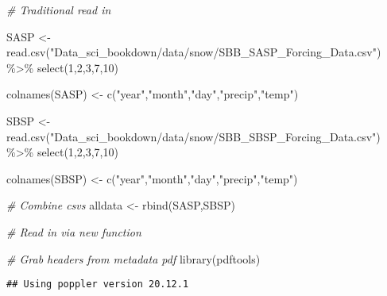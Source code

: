 \documentclass[
]{book}
\newenvironment{Shaded}{\begin{snugshade}}{\end{snugshade}}
\newcommand{\CommentTok}[1]{\textcolor[rgb]{0.56,0.35,0.01}{\textit{#1}}}
\newcommand{\DecValTok}[1]{\textcolor[rgb]{0.00,0.00,0.81}{#1}}
\newcommand{\FunctionTok}[1]{\textcolor[rgb]{0.00,0.00,0.00}{#1}}
\newcommand{\NormalTok}[1]{#1}
\newcommand{\OtherTok}[1]{\textcolor[rgb]{0.56,0.35,0.01}{#1}}
\newcommand{\SpecialCharTok}[1]{\textcolor[rgb]{0.00,0.00,0.00}{#1}}
\newcommand{\StringTok}[1]{\textcolor[rgb]{0.31,0.60,0.02}{#1}}
\begin{document}
\begin{Shaded}
\begin{Highlighting}[]
\CommentTok{\# Traditional read in}

\NormalTok{SASP }\OtherTok{\textless{}{-}} \FunctionTok{read.csv}\NormalTok{(}\StringTok{"Data\_sci\_bookdown/data/snow/SBB\_SASP\_Forcing\_Data.csv"}\NormalTok{) }\SpecialCharTok{\%\textgreater{}\%}
  \FunctionTok{select}\NormalTok{(}\DecValTok{1}\NormalTok{,}\DecValTok{2}\NormalTok{,}\DecValTok{3}\NormalTok{,}\DecValTok{7}\NormalTok{,}\DecValTok{10}\NormalTok{)}
  
\FunctionTok{colnames}\NormalTok{(SASP) }\OtherTok{\textless{}{-}} \FunctionTok{c}\NormalTok{(}\StringTok{"year"}\NormalTok{,}\StringTok{"month"}\NormalTok{,}\StringTok{"day"}\NormalTok{,}\StringTok{"precip"}\NormalTok{,}\StringTok{"temp"}\NormalTok{)}

\NormalTok{SBSP }\OtherTok{\textless{}{-}} \FunctionTok{read.csv}\NormalTok{(}\StringTok{"Data\_sci\_bookdown/data/snow/SBB\_SBSP\_Forcing\_Data.csv"}\NormalTok{) }\SpecialCharTok{\%\textgreater{}\%}
  \FunctionTok{select}\NormalTok{(}\DecValTok{1}\NormalTok{,}\DecValTok{2}\NormalTok{,}\DecValTok{3}\NormalTok{,}\DecValTok{7}\NormalTok{,}\DecValTok{10}\NormalTok{)}
  
\FunctionTok{colnames}\NormalTok{(SBSP) }\OtherTok{\textless{}{-}} \FunctionTok{c}\NormalTok{(}\StringTok{"year"}\NormalTok{,}\StringTok{"month"}\NormalTok{,}\StringTok{"day"}\NormalTok{,}\StringTok{"precip"}\NormalTok{,}\StringTok{"temp"}\NormalTok{)}

\CommentTok{\# Combine csvs}
\NormalTok{alldata }\OtherTok{\textless{}{-}} \FunctionTok{rbind}\NormalTok{(SASP,SBSP)}

\CommentTok{\# Read in via new function}

\CommentTok{\# Grab headers from metadata pdf}
\FunctionTok{library}\NormalTok{(pdftools)}
\end{Highlighting}
\end{Shaded}

\begin{verbatim}
## Using poppler version 20.12.1
\end{verbatim}
\end{document}
